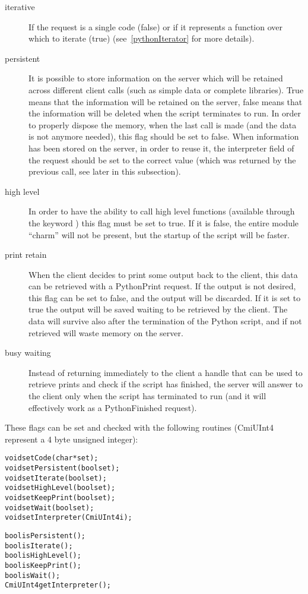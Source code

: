 \begin{description}

\item[iterative]
If the request is a single code (false) or if it represents a function over
which to iterate (true) (see~\ref{pythonIterator} for more details).

\item[persistent]
It is possible to store information on the server which will be retained across
different client calls (such as simple data or complete libraries). True means
that the information will be retained on the server, false means that the
information will be deleted when the script terminates to run. In order to
properly dispose the memory, when the last call is made (and the data is not
anymore needed), this flag should be set to false. When information has been
stored on the server, in order to reuse it, the interpreter field of the request
should be set to the correct value (which was returned by the previous call, see
later in this subsection).

\item[high level]
In order to have the ability to call high level \charmpp{} functions (available
through the keyword ) this flag must be set to true. If it is false,
the entire module ``charm'' will not be present, but the startup of the script
will be faster.

\item[print retain]
When the client decides to print some output back to the client, this data can be
retrieved with a PythonPrint request. If the output is not desired, this flag
can be set to false, and the output will be discarded. If it is set to true the
output will be saved waiting to be retrieved by the client. The data will
survive also after the termination of the Python script, and if not retrieved
will waste memory on the server.

\item[busy waiting]
Instead of returning immediately to the client a handle that can be used to
retrieve prints and check if the script has finished, the server will answer to
the client only when the script has terminated to run (and it will effectively
work as a PythonFinished request).

\end{description}

These flags can be set and checked with the following routines (CmiUInt4 represent a 4
byte unsigned integer):

\begin{alltt}
void setCode(char *set);
void setPersistent(bool set);
void setIterate(bool set);
void setHighLevel(bool set);
void setKeepPrint(bool set);
void setWait(bool set);
void setInterpreter(CmiUInt4 i);

bool isPersistent();
bool isIterate();
bool isHighLevel();
bool isKeepPrint();
bool isWait();
CmiUInt4 getInterpreter();
\end{alltt}

